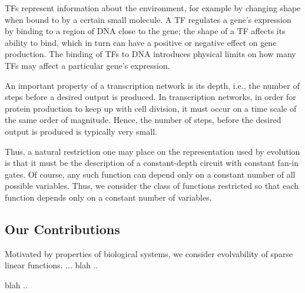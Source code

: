 
TFs represent information about the environment,
for example by changing shape when bound to by a certain small molecule.
A TF regulates a gene's expression by binding to a region of DNA close to the
gene; the shape of a TF affects its ability to bind,
which in turn can have a positive or negative effect on gene production.
The binding of TFs to DNA introduces physical limits on how many TFs may affect
a particular gene's expression.


An important property of a transcription network is its depth, i.e.,
the number of steps before a desired output is produced. In transcription
networks, in order for protein production to keep up with cell division,
it must occur on a time scale of the same order of magnitude. Hence, the
number of steps, before the desired output is produced is typically very small.


Thus, a natural restriction one may place on the representation used by
evolution is that it must be the description of a constant-depth circuit with
constant fan-in gates. Of course, any such function can depend only on a
constant number of all possible variables. Thus, we consider the class of
functions restricted so that each function depends only on a constant number of
variables.


\subsection{Our Contributions}

Motivated by properties of biological systems, we consider evolvability of
sparse linear functions. ... blah ..

blah ..
